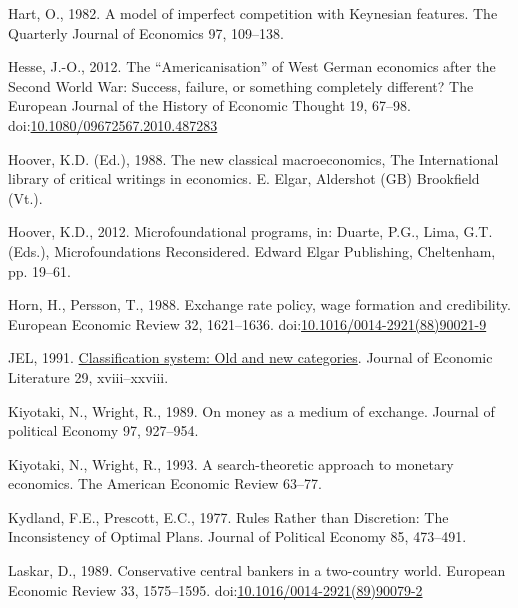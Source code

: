 \documentclass[
]{article}
\newlength{\cslhangindent}
\newlength{\cslentryspacingunit} %
\newenvironment{CSLReferences}[2] %
 {%
  \setlength{\parindent}{0pt}
  \ifodd #1
  \let\oldpar\par
  \def\par{\hangindent=\cslhangindent\oldpar}
  \fi
  \setlength{\parskip}{#2\cslentryspacingunit}
 }%
 {}
\begin{document}
\begin{CSLReferences}{1}{0}
\leavevmode{}%
Hart, O., 1982. A model of imperfect competition with {Keynesian}
features. The Quarterly Journal of Economics 97, 109--138.

\leavevmode{}%
Hesse, J.-O., 2012. The {``{Americanisation}''} of {West German}
economics after the {Second World War}: {Success}, failure, or something
completely different? The European Journal of the History of Economic
Thought 19, 67--98.
doi:\href{https://doi.org/10.1080/09672567.2010.487283}{10.1080/09672567.2010.487283}

\leavevmode{}%
Hoover, K.D. (Ed.), 1988. The new classical macroeconomics, The
{International} library of critical writings in economics. E. Elgar,
Aldershot (GB) Brookfield (Vt.).

\leavevmode{}%
Hoover, K.D., 2012. Microfoundational programs, in: Duarte, P.G., Lima,
G.T. (Eds.), Microfoundations {Reconsidered}. Edward Elgar Publishing,
Cheltenham, pp. 19--61.

\leavevmode{}%
Horn, H., Persson, T., 1988. Exchange rate policy, wage formation and
credibility. European Economic Review 32, 1621--1636.
doi:\href{https://doi.org/10.1016/0014-2921(88)90021-9}{10.1016/0014-2921(88)90021-9}

\leavevmode{}%
JEL, 1991. \href{https://www.jstor.org/stable/2727351}{Classification
system: Old and new categories}. Journal of Economic Literature 29,
xviii--xxviii.

\leavevmode{}%
Kiyotaki, N., Wright, R., 1989. On money as a medium of exchange.
Journal of political Economy 97, 927--954.

\leavevmode{}%
Kiyotaki, N., Wright, R., 1993. A search-theoretic approach to monetary
economics. The American Economic Review 63--77.

\leavevmode{}%
Kydland, F.E., Prescott, E.C., 1977. Rules {Rather} than {Discretion}:
{The Inconsistency} of {Optimal Plans}. Journal of Political Economy 85,
473--491.

\leavevmode{}%
Laskar, D., 1989. Conservative central bankers in a two-country world.
European Economic Review 33, 1575--1595.
doi:\href{https://doi.org/10.1016/0014-2921(89)90079-2}{10.1016/0014-2921(89)90079-2}


\end{CSLReferences}
\end{document}
